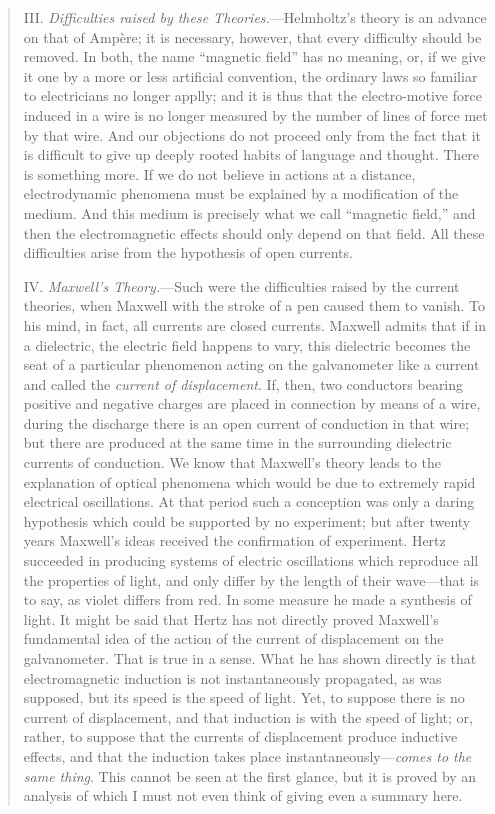 \documentclass{article}
\begin{document}
\begin{quote}
    III. \emph{Difficulties raised by these Theories.}---Helmholtz's theory is an advance on that of Amp\`ere; it is necessary, however, that every difficulty should be removed.  In both, the name ``magnetic field'' has no meaning, or, if we give it one by a more or less artificial convention, the ordinary laws so familiar to electricians no longer applly; and it is thus that the electro-motive force induced in a wire is no longer measured by the number of lines of force met by that wire.  And our objections do not proceed only from the fact that it is difficult to give up deeply rooted habits of language and thought.  There is something more.  If we do not believe in actions at a distance, electrodynamic phenomena must be explained by a modification of the medium.  And this medium is precisely what we call ``magnetic field,'' and then the electromagnetic effects should only depend on that field.  All these difficulties arise from the hypothesis of open currents.
    
    IV.  \emph{Maxwell's Theory.}---Such were the difficulties raised by the current theories, when Maxwell with the stroke of a pen caused them to vanish.  To his mind, in fact, all currents are closed currents.  Maxwell admits that if in a dielectric, the electric field happens to vary, this dielectric becomes the seat of a particular phenomenon acting on the galvanometer like a current and called the \emph{current of displacement}.  If, then, two conductors bearing positive and negative charges are placed in connection by means of a wire, during the discharge there is an open current of conduction in that wire; but there are produced at the same time in the surrounding dielectric currents of conduction.  We know that Maxwell's theory leads to the explanation of optical phenomena which would be due to extremely rapid electrical oscillations.  At that period such a conception was only a daring hypothesis which could be supported by no experiment; but after twenty years Maxwell's ideas received the confirmation of experiment.  Hertz succeeded in producing systems of electric oscillations which reproduce all the properties of light, and only differ by the length of their wave---that is to say, as violet differs from red.  In some measure he made a synthesis of light.  It might be said that Hertz has not directly proved Maxwell's fundamental idea of the action of the current of displacement on the galvanometer.  That is true in a sense.  What he has shown directly is that electromagnetic induction is not instantaneously propagated, as was supposed, but its speed is the speed of light.  Yet, to suppose there is no current of displacement, and that induction is with the speed of light; or, rather, to suppose that the currents of displacement produce inductive effects, and that the induction takes place instantaneously---\emph{comes to the same thing}.  This cannot be seen at the first glance, but it is proved by an analysis of which I must not even think of giving even a summary here.
    
    \citep[p. 238-240]{Poincare1952}
\end{quote}
\end{document}

